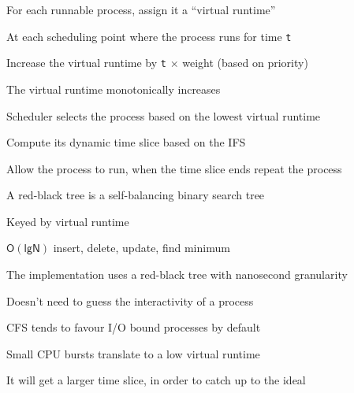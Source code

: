   \begin{slide}


    For each runnable process, assign it a ``virtual runtime''

    \leftspace{}At each scheduling point where the process runs for time \texttt{t}

    \leftspace{}\leftspace{}Increase the virtual runtime by \texttt{t}
    $\mathsf{\times}$ weight (based on priority)
    \medskip

    The virtual runtime monotonically increases

    \leftspace{}Scheduler selects the process based on the lowest virtual runtime

    \leftspace{}\leftspace{}Compute its dynamic time slice based on the IFS
    \medskip

    Allow the process to run, when the time slice ends repeat the process

  \end{slide}

  \begin{slide}


    A red-black tree is a self-balancing binary search tree

    \leftspace{}Keyed by virtual runtime

    \leftspace{}\leftspace{}$\mathsf{O(lg N)}$ insert, delete, update, find
    minimum
    \medskip

    The implementation uses a red-black tree with nanosecond granularity

    \leftspace{}Doesn't need to guess the interactivity of a process
    \medskip

    CFS tends to favour I/O bound processes by default

    \leftspace{}Small CPU bursts translate to a low virtual runtime

    \leftspace{}\leftspace{}It will get a larger time slice, in order to catch
    up to the ideal

  \end{slide}


